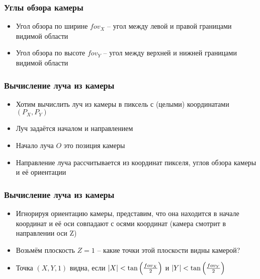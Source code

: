 \documentclass[10pt,handout]{beamer}
\begin{document}
\begin{frame}
\frametitle{Углы обзора камеры}
\begin{itemize}
\item Угол обзора по ширине \begin{math}fov_X\end{math} -- угол между левой и правой границами видимой области
\pause
\item Угол обзора по высоте \begin{math}fov_Y\end{math} -- угол между верхней и нижней границами видимой области
\end{itemize}
\end{frame}

\begin{frame}
\frametitle{Вычисление луча из камеры}
\begin{itemize}
\item Хотим вычислить луч из камеры в пиксель с (целыми) координатами \begin{math}(P_X, P_Y)\end{math}
\pause
\item Луч задаётся началом и направлением
\pause
\item Начало луча \begin{math}O\end{math} это позиция камеры
\pause
\item Направление луча рассчитывается из координат пикселя, углов обзора камеры и её ориентации
\end{itemize}
\end{frame}

\begin{frame}
\frametitle{Вычисление луча из камеры}
\begin{itemize}
\item Игнорируя ориентацию камеры, представим, что она находится в начале координат и её оси совпадают с осями координат (камера смотрит в направлении оси Z)
\pause
\item Возьмём плоскость \begin{math}Z=1\end{math} -- какие точки этой плоскости видны камерой?
\pause
\item Точка \begin{math}(X, Y, 1)\end{math} видна, если \begin{math}|X| < \tan\left({fov_X\over 2}\right)\end{math} и \begin{math}|Y| < \tan\left({fov_Y\over 2}\right)\end{math}
\end{itemize}
\end{frame}
\end{document}
